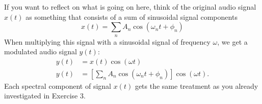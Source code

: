 \begin{enumerate}
\begin{itemize}
\end{itemize}
If you want to reflect on what is going on here, think of the original
audio signal $x(t)$ as something that consists of a sum of sinusoidal
signal components
\begin{equation}
    x(t) = \sum_{n} A_n \cos(\omega_n t + \phi_n)
\end{equation}
When multiplying this signal with a sinusoidal signal of frequency $\omega$, we get a modulated audio signal $y(t)$:
\begin{align}
y(t) &= x(t) \cos(\omega t)\\
  y(t) &= \left[\sum_{n} A_n \cos(\omega_n t + \phi_n)\right] \cos(\omega t).
\end{align}
Each spectral component of signal $x(t)$ gets the same treatment as you already investigated in Exercise 3.

\end{enumerate}

